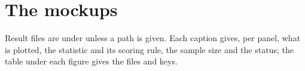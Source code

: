
\section{The mockups}
\label{sec:mockups}

Result files are under  unless a path is
given. Each caption gives, per panel, what is plotted, the statistic and its scoring rule,
the sample size and the status; the table under each figure gives the files and keys.

